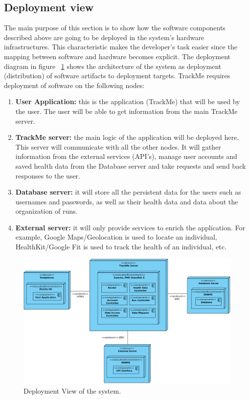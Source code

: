 \documentclass[12pt]{article}
\begin{document}
\subsection{Deployment view}
The main purpose of this section is to show how the software components described above are going to be 
deployed in the system's hardware infrastructures. This characteristic makes the developer's task easier 
since the mapping between software and hardware becomes explicit. The deployment diagram in figure ~\ref{fig:DeploymentView} shows the architecture of the system as deployment (distribution) of software artifacts
to deployment targets. TrackMe requires deployment of software on the following nodes:
\begin{enumerate}
    \item \textbf{User Application:} this is the application (TrackMe) that will be used by the user. The user will be able to get information from the main TrackMe server.
    \item \textbf{TrackMe server:} the main logic of the application will be deployed here. This server will communicate with all the other nodes. It will gather information from the external services (API's), manage user accounts and saved health data from the Database server and take requests and send back responses to the user.
    \item \textbf{Database server:} it will store all the persistent data for the users such as usernames and passwords, as well as their health data and data about the organization of runs.
    \item \textbf{External server:} it will only provide services to enrich the application. For example, Google Maps/Geolocation is used to locate an individual, HealthKit/Google Fit is used to track the health of an individual, etc.
     
\end{enumerate}


\begin{figure}[H]
\centering
\centerline{\includegraphics[scale=0.45]{DeploymentView.png}}
\caption{Deployment View of the system.}
\label{fig:DeploymentView}
\end{figure}
\end{document}
